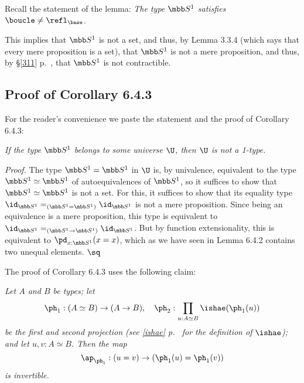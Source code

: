 \documentclass[12pt]{article}
\begin{document}
Recall the statement of the lemma: \emph{The type $\mbb S^1$ satisfies} $\boucle\neq\refl_{\base}$. 

This implies that $\mbb S^1$ is not a set, and thus, by Lemma 3.3.4 (which says that every mere proposition is a set), that $\mbb S^1$ is not a mere proposition, and thus, by \S\ref{311} p.~\pageref{311}, that $\mbb S^1$ is not contractible.


\subsection{Proof of Corollary 6.4.3} %

For the reader's convenience we paste the statement and the proof of Corollary 6.4.3:

\nn{} \emph{If the type $\mbb S^1$ belongs to some universe $\U$, then $\U$ is not a 1-type.}

\nn\emph{Proof.} The type $\mbb S^1=\mbb S^1$ in $\U$ is, by univalence, equivalent to the type $\mbb S^1\simeq\mbb S^1$ of auto\-equivalences of $\mbb S^1$, so it suffices to show that $\mbb S^1\simeq\mbb S^1$ is not a set. For this, it suffices to show that its equality type $\id_{\mbb S^1}=_{(\mbb S^1=\mbb S^1)}\id_{\mbb S^1}$ is not a mere proposition. Since being an equivalence is a mere proposition, this type is equivalent to $\id_{\mbb S^1}=_{(\mbb S^1\to\mbb S^1)}\id_{\mbb S^1}$. But by function extensionality, this is equivalent to $\pd_{x:\mbb S^1}(x=x)$, which as we have seen in Lemma 6.4.2 contains two unequal elements. $\sq$

The proof of Corollary 6.4.3 uses the following claim:

\nn{} \emph{Let $A$ and $B$ be types; let  
$$
\ph_1:(A\simeq B)\to(A\to B),\quad\ph_2:\prod_{u:A\simeq B}\ishae(\ph_1(u))
$$ 
be the first and second projection (see \eqref{ishae} p.~\pageref{ishae} for the definition of $\ishae$); and let $u,v:A\simeq B$. Then the map 
\begin{equation}\label{apph}
\ap_{\ph_1}:(u=v)\to(\ph_1(u)=\ph_1(v))
\end{equation}
is invertible.}
\end{document}
